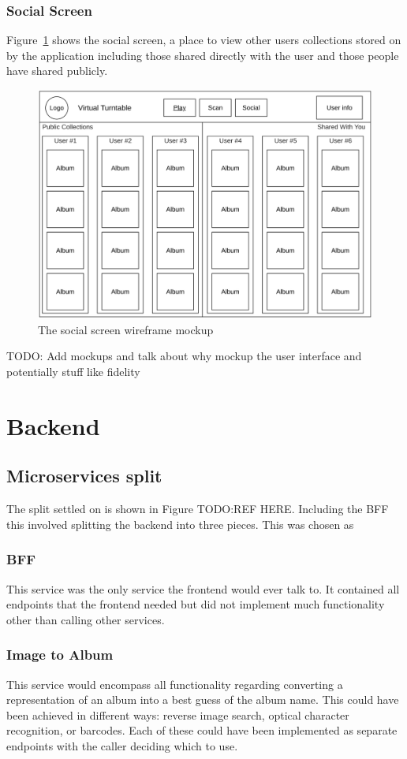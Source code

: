 \subsubsection{Social Screen}
Figure~\ref{fig:social_screen_mockup} shows the social screen, a place to view other users collections stored on by the application including those shared directly with the user and those people have shared publicly.
\begin{figure} [H]
    \centering
    \includegraphics[width=0.6\linewidth]{figures/social_screen_mockup.png}
    \caption{The social screen wireframe mockup}
    \label{fig:social_screen_mockup}
\end{figure}



TODO: Add mockups and talk about why mockup the user interface and potentially stuff like fidelity

\section{Backend} \label{sec:backend-design}
\subsection{Microservices split} %
The split settled on is shown in Figure TODO:REF HERE. Including the BFF this involved splitting the backend into three pieces. This was chosen as

\subsubsection{BFF}
This service was the only service the frontend would ever talk to. It contained all endpoints that the frontend needed but did not implement much functionality other than calling other services.
\subsubsection{Image to Album}
This service would encompass all functionality regarding converting a representation of an album into a best guess of the album name. This could have been achieved in different ways: reverse image search, optical character recognition, or barcodes. Each of these could have been implemented as separate endpoints with the caller deciding which to use.
